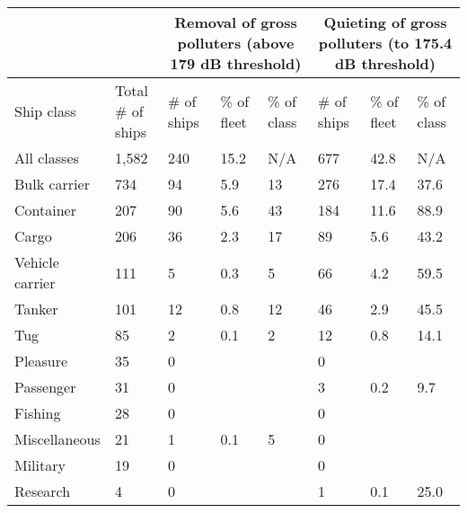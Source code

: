 \usepackage{multirow}
\begin{longtable}[]{@{}llllllll@{}}
\toprule
& & \multicolumn{3}{|c|}{Removal of gross polluters (above 179 dB threshold)} & \multicolumn{3}{|c|}{Quieting of gross polluters (to 175.4 dB threshold)}\tabularnewline
\midrule
\endhead
Ship class & Total \# of ships & \# of ships & \% of fleet & \% of class
& \# of ships & \% of fleet & \% of class\tabularnewline
All classes & 1,582 & 240 & 15.2 & N/A & 677 & 42.8 & N/A\tabularnewline
Bulk carrier & 734 & 94 & 5.9 & 13 & 276 & 17.4 & 37.6\tabularnewline
Container & 207 & 90 & 5.6 & 43 & 184 & 11.6 & 88.9\tabularnewline
Cargo & 206 & 36 & 2.3 & 17 & 89 & 5.6 & 43.2\tabularnewline
Vehicle carrier & 111 & 5 & 0.3 & 5 & 66 & 4.2 & 59.5\tabularnewline
Tanker & 101 & 12 & 0.8 & 12 & 46 & 2.9 & 45.5\tabularnewline
Tug & 85 & 2 & 0.1 & 2 & 12 & 0.8 & 14.1\tabularnewline
Pleasure & 35 & 0 & & & 0 & &\tabularnewline
Passenger & 31 & 0 & & & 3 & 0.2 & 9.7\tabularnewline
Fishing & 28 & 0 & & & 0 & &\tabularnewline
Miscellaneous & 21 & 1 & 0.1 & 5 & 0 & &\tabularnewline
Military & 19 & 0 & & & 0 & &\tabularnewline
Research & 4 & 0 & & & 1 & 0.1 & 25.0\tabularnewline
\bottomrule
\end{longtable}